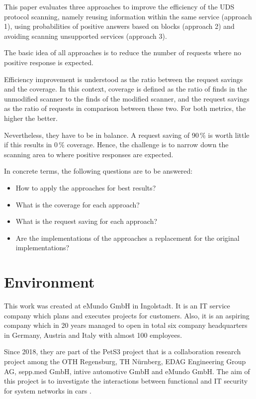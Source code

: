 This paper evaluates three approaches to improve the efficiency of the UDS protocol scanning, namely reusing information within the same service (approach 1), using probabilities of positive answers based on blocks (approach 2) and avoiding scanning unsupported services (approach 3).

The basic idea of all approaches is to reduce the number of requests where no positive response is expected.

Efficiency improvement is understood as the ratio between the request savings and the coverage. In this context, coverage is defined as the ratio of finds in the unmodified scanner to the finds of the modified scanner, and the request savings as the ratio of requests in comparison between these two. For both metrics, the higher the better.

Nevertheless, they have to be in balance. A request saving of 90\,\% is worth little if this results in 0\,\% coverage. Hence, the challenge is to narrow down the scanning area to where positive responses are expected.

In concrete terms, the following questions are to be answered:

\begin{itemize}
    \item How to apply the approaches for best results?
    \item What is the coverage for each approach?
    \item What is the request saving for each approach?
    \item Are the implementations of the approaches a replacement for the original implementations?
\end{itemize}


\section{Environment}
This work was created at eMundo GmbH in Ingolstadt. It is an IT service company which plans and executes projects for customers. Also, it is an aspiring company which in 20 years managed to open in total six company headquarters in Germany, Austria and Italy with almost 100 employees.

Since 2018, they are part of the PetS3 project that is a collaboration research project among the OTH Regensburg, TH Nürnberg, EDAG Engineering Group AG, sepp.med GmbH, intive automotive GmbH and eMundo GmbH. The aim of this project is to investigate the interactions between functional and IT security for system networks in cars \cite{pets3}.

